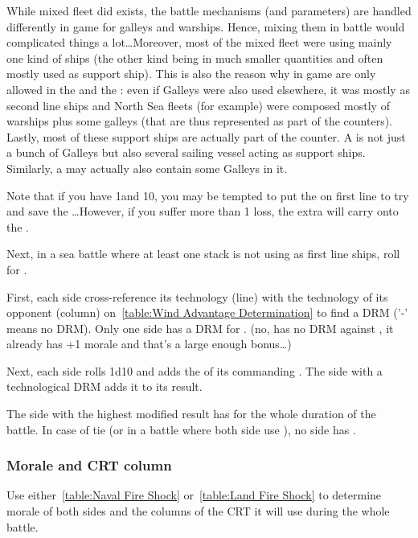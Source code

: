 \begin{designnote}
  While mixed fleet did exists, the battle mechanisms (and parameters) are
  handled differently in game for galleys and warships. Hence, mixing them in
  battle would complicated things a lot\ldots Moreover, most of the mixed
  fleet were using mainly one kind of ships (the other kind being in much
  smaller quantities and often mostly used as support ship). This is also the
  reason why in game \NGD are only allowed in the  and
  the : even if Galleys were also used elsewhere, it was
  mostly as second line ships and North Sea fleets (for example) were composed
  mostly of warships plus some galleys (that are thus represented as part of
  the counters). Lastly, most of these support ships are actually part of the
  counter. A \NGD is not just a bunch of Galleys but also several sailing
  vessel acting as support ships. Similarly, a \NWD may actually also contain
  some Galleys in it.

  \smallskip

  Note that if you have 1\NWD and 10\NGD, you may be tempted to put the \NWD
  on first line to try and save the \NGD\ldots However, if you suffer more
  than 1 loss, the extra will carry onto the \NGD.
\end{designnote}

Next, in a sea battle where at least one stack is not using \NGD as first line
ships, roll for .


First, each side cross-reference its technology (line) with the technology of
its opponent (column) on~\ref{table:Wind Advantage Determination} to find a
DRM ('-' means no DRM). Only one side has a DRM for .
(no, \TBAT has no DRM against \TGF, it already has +1 morale and that's a
large enough bonus\ldots)

Next, each side rolls 1d10 and adds the \Man of its commanding \LeaderA. The
side with a technological DRM adds it to its result.

The side with the highest modified result has  for the
whole duration of the battle. In case of tie (or in a battle where both side
use \NGD), no side has .

\subsubsection{Morale and CRT column}
\label{chMilitary:Battle:Parameters:CRT}
Use either~\ref{table:Naval Fire Shock} or~\ref{table:Land Fire Shock} to
determine morale of both sides and the columns of the CRT it will use during
the whole battle.

